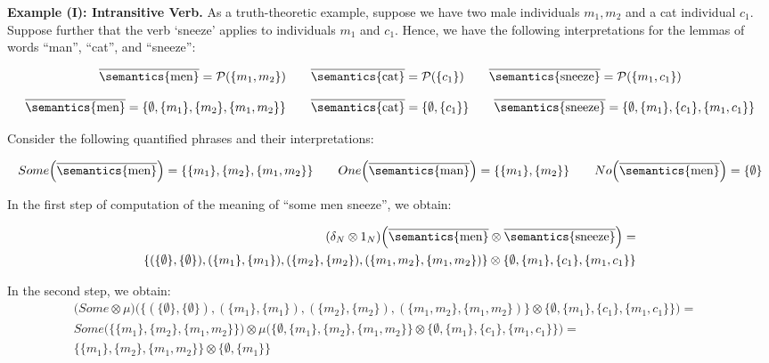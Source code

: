 

\bigskip
\bigskip
\noindent
{\bf Example (I): Intransitive Verb.} As a truth-theoretic  example,  suppose we have two male individuals $m_1, m_2$  and a cat   individual $c_1$.  Suppose further that  the verb `sneeze'  applies to individuals $m_1$ and $c_1$. Hence, we have the following interpretations for the lemmas of words ``man'', ``cat'', and ``sneeze'':

\[
\overline{\semantics{\text{men}}} =  {\cal P}(\{m_1, m_2\})  \qquad
\overline{\semantics{\text{cat}}} =  {\cal P}(\{c_1\})  \qquad
\overline{\semantics{\text{sneeze}}} = {\cal P}(\{m_1, c_1\})
\]

\[
\overline{\semantics{\text{men}}} =  \{\emptyset,  \{m_1\}, \{m_2\}, \{m_1, m_2\}\}  \qquad
\overline{\semantics{\text{cat}}} =  \{\emptyset, \{c_1\}\}  \qquad
\overline{\semantics{\text{sneeze}}} = \{\emptyset, \{m_1\}, \{c_1\}, \{m_1, c_1\}\}
\]

\noindent
Consider the  following quantified phrases and their interpretations:

\[
Some\Big(\overline{\semantics{\text{men}}}\Big) =  \{\{m_1\}, \{m_2\}, \{m_1, m_2\}\} \qquad
One\Big(\overline{\semantics{\text{man}}}\Big) = \{\{m_1\}, \{m_2\}\} \qquad 
No\Big(\overline{\semantics{\text{men}}}\Big) = \{\emptyset\}
\]

\noindent
In the first step of computation of the meaning of  ``some men sneeze'', we obtain:

\begin{align*}
(\delta_N \otimes 1_{N})\Big(\overline{\semantics{\text{men}}} \otimes \overline{\semantics{\text{sneeze}}}\Big) =&\\
  \{(\{\emptyset\}, \{\emptyset\}), (\{m_1\}, \{m_1\}), (\{m_2\}, \{m_2\}), (\{m_1, m_2\}, \{m_1, m_2\}) \} \otimes  \{\emptyset, \{m_1\}, \{c_1\}, \{m_1, c_1\}\} 
\end{align*}

\noindent
In the second step, we obtain:
\begin{align*}
\Big(Some \otimes \mu\Big) \Big ( \{(\{\emptyset\}, \{\emptyset\}), (\{m_1\}, \{m_1\}), (\{m_2\}, \{m_2\}), (\{m_1, m_2\}, \{m_1, m_2\}) \} \otimes  \{\emptyset, \{m_1\}, \{c_1\}, \{m_1, c_1\}\}  \Big) =&\\
Some\Big ( \{\{m_1\}, \{m_2\}, \{m_1, m_2\}\} \Big) \otimes \mu \Big( \{\emptyset, \{m_1\}, \{m_2\}, \{m_1, m_2\}\}  \otimes \{\emptyset, \{m_1\}, \{c_1\}, \{m_1, c_1\}\} \Big)=&\\
\{\{m_1\}, \{m_2\}, \{m_1, m_2\}\}  \otimes \{\emptyset, \{m_1\}\}
\end{align*}

